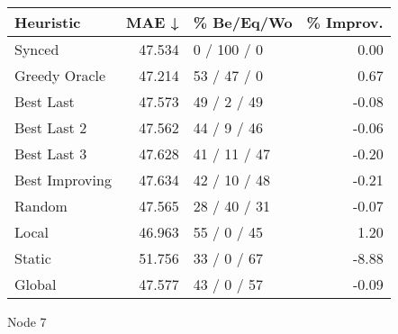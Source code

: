 \begin{tabular}{lrlr}
\toprule
\textbf{Heuristic} & \textbf{MAE ↓} & \textbf{\% Be/Eq/Wo} & \textbf{\% Improv.} \\
\midrule
            Synced &         47.534 &          0 / 100 / 0 &                0.00 \\
     Greedy Oracle &         47.214 &          53 / 47 / 0 &                0.67 \\
         Best Last &         47.573 &          49 / 2 / 49 &               -0.08 \\
       Best Last 2 &         47.562 &          44 / 9 / 46 &               -0.06 \\
       Best Last 3 &         47.628 &         41 / 11 / 47 &               -0.20 \\
    Best Improving &         47.634 &         42 / 10 / 48 &               -0.21 \\
            Random &         47.565 &         28 / 40 / 31 &               -0.07 \\
             Local &         46.963 &          55 / 0 / 45 &                1.20 \\
            Static &         51.756 &          33 / 0 / 67 &               -8.88 \\
            Global &         47.577 &          43 / 0 / 57 &               -0.09 \\
\bottomrule
\end{tabular}
\caption{Node 7}
\label{tab:iid_lr01_le2_bs2_7}
